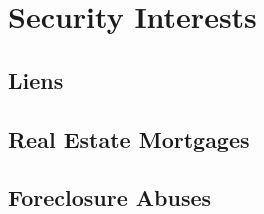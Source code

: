 \chapter{Security Interests}



\section{Liens}



\begin{questions}

\end{questions}



\begin{questions}

\end{questions}



\section{Real Estate Mortgages}



\begin{questions}

\end{questions}

\section{Foreclosure Abuses}





\begin{questions}

\end{questions}


